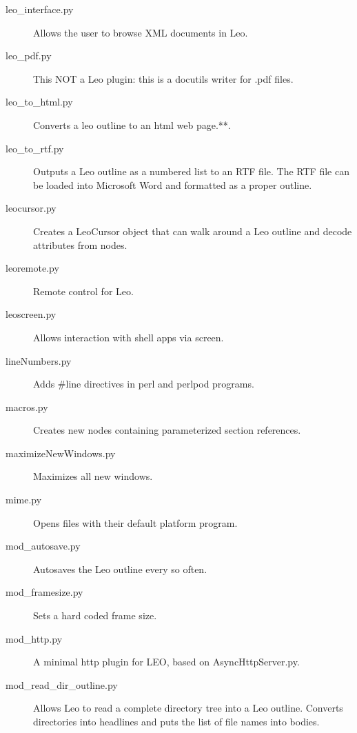 \documentclass[a4paper,10pt,english]{sphinxmanual}
\begin{document}
\begin{description}
\item[{leo\_interface.py}] \leavevmode
Allows the user to browse XML documents in Leo.

\item[{leo\_pdf.py}] \leavevmode
This NOT a Leo plugin: this is a docutils writer for .pdf files.

\item[{leo\_to\_html.py}] \leavevmode
Converts a leo outline to an html web page.**.

\item[{leo\_to\_rtf.py}] \leavevmode
Outputs a Leo outline as a numbered list to an RTF file. The RTF file can be
loaded into Microsoft Word and formatted as a proper outline.

\item[{leocursor.py}] \leavevmode
Creates a LeoCursor object that can walk around a Leo outline and decode
attributes from nodes.

\item[{leoremote.py}] \leavevmode
Remote control for Leo.

\item[{leoscreen.py}] \leavevmode
Allows interaction with shell apps via screen.

\item[{lineNumbers.py}] \leavevmode
Adds \#line directives in perl and perlpod programs.

\item[{macros.py}] \leavevmode
Creates new nodes containing parameterized section references.

\item[{maximizeNewWindows.py}] \leavevmode
Maximizes all new windows.

\item[{mime.py}] \leavevmode
Opens files with their default platform program.

\item[{mod\_autosave.py}] \leavevmode
Autosaves the Leo outline every so often.

\item[{mod\_framesize.py}] \leavevmode
Sets a hard coded frame size.

\item[{mod\_http.py}] \leavevmode
A minimal http plugin for LEO, based on AsyncHttpServer.py.

\item[{mod\_read\_dir\_outline.py}] \leavevmode
Allows Leo to read a complete directory tree into a Leo outline. Converts
directories into headlines and puts the list of file names into bodies.


\end{description}
\end{document}
